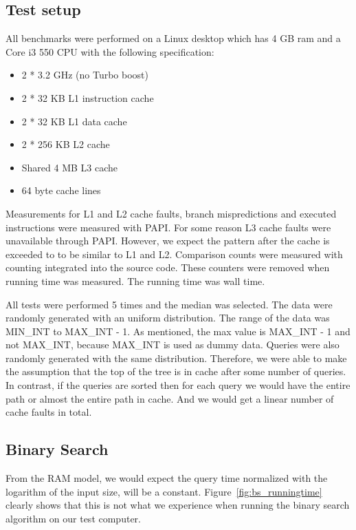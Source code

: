 \subsection{Test setup}

All benchmarks were performed on a Linux desktop which has 4 GB ram and a Core i3 550 CPU with the following specification:

\begin{itemize}
\item 2 * 3.2 GHz (no Turbo boost)
\item 2 * 32 KB L1 instruction cache
\item 2 * 32 KB L1 data cache
\item 2 * 256 KB L2 cache
\item Shared 4 MB L3 cache
\item 64 byte cache lines
\end{itemize}

Measurements for L1 and L2 cache faults, branch mispredictions and executed instructions were measured with PAPI. For some reason L3 cache faults were unavailable through PAPI. However, we expect the pattern after the cache is exceeded to  to be similar to L1 and L2. Comparison counts were measured with counting integrated into the source code. These counters were removed when running time was measured. The running time was wall time.


All tests were performed 5 times and the median was selected. The data were randomly generated with an uniform distribution. The range of the data was MIN\_INT to MAX\_INT - 1. As mentioned, the max value is MAX\_INT - 1 and not MAX\_INT, because MAX\_INT is used as dummy data. Queries were also randomly generated with the same distribution. Therefore, we were able to make the assumption that the top of the tree is in cache after some number of queries. In contrast, if the queries are sorted then for each query we would have the entire path or almost the entire path in cache. And we would get a linear number of cache faults in total.



\subsection{Binary Search}
From the RAM model, we would expect the query time normalized with the
logarithm of the input size, will be a
constant. Figure~\ref{fig:bs_runningtime} clearly shows that this is
not what we experience when running the binary search algorithm on our
test computer.

